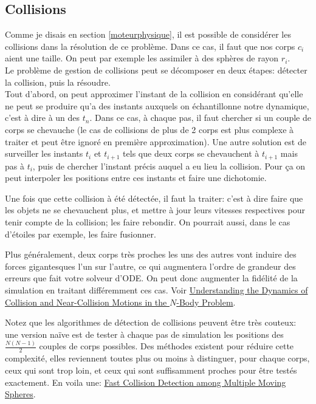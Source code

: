 \documentclass{article}
\begin{document}
\subsection{Collisions}
\label{collisions}

Comme je disais en section \ref{moteurphysique}, il est possible de considérer les collisions dans la résolution de ce problème. Dans ce cas, il faut que nos corps $c_i$ aient une taille. On peut par exemple les assimiler à des sphères de rayon $r_i$.\\
Le problème de gestion de collisions peut se décomposer en deux étapes: détecter la collision, puis la résoudre.\\

Tout d'abord, on peut approximer l'instant de la collision en considérant qu'elle ne peut se produire qu'a des instants auxquels on échantillonne notre dynamique, c'est à dire à un des $t_n$. Dans ce cas, à chaque pas, il faut chercher si un couple de corps se chevauche (le cas de collisions de plus de 2 corps est plus complexe à traiter et peut être ignoré en première approximation). Une autre solution est de surveiller les instants $t_i$ et $t_{i+1}$ tels que deux corps se chevauchent à $t_{i+1}$ mais pas à $t_i$, puis de chercher l'instant précis auquel a eu lieu la collision. Pour ça on peut interpoler les positions entre ces instants et faire une dichotomie.

Une fois que cette collision à été détectée, il faut la traiter: c'est à dire faire que les objets ne se chevauchent plus, et mettre à jour leurs vitesses respectives pour tenir compte de la collision; les faire rebondir. On pourrait aussi, dans le cas d'étoiles par exemple, les faire fusionner.

Plus généralement, deux corps très proches les uns des autres vont induire des forces gigantesques l'un sur l'autre, ce qui augmentera l'ordre de grandeur des erreurs que fait votre solveur d'ODE. On peut donc augmenter la fidélité de la simulation en traitant différemment ces cas. Voir \href{https://arxiv.org/pdf/1208.6313.pdf}{Understanding the Dynamics of Collision and Near-Collision Motions in the $N$-Body Problem}.

Notez que les algorithmes de détection de collisions peuvent être très couteux: une version naïve est de tester à chaque pas de simulation les positions des $\frac{N(N-1)}{2}$ couples de corps possibles. Des méthodes existent pour réduire cette complexité, elles reviennent toutes plus ou moins à distinguer, pour chaque corps, ceux qui sont trop loin, et ceux qui sont suffisamment proches pour être testés exactement. En voila une:  \href{https://www2.cs.duke.edu/courses/cps124/fall01/resources/p373-kim.pdf}{Fast Collision Detection among Multiple Moving Spheres}.
\end{document}
